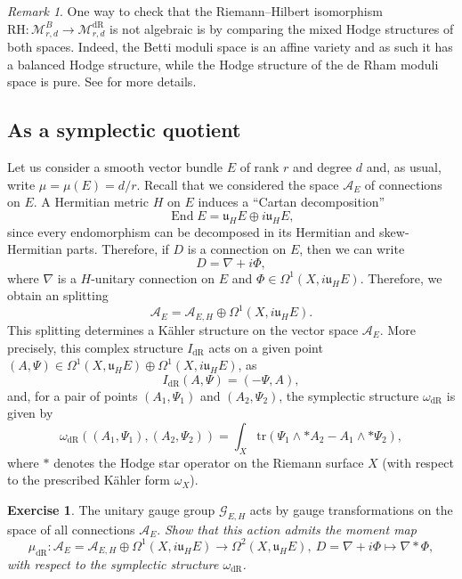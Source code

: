 \documentclass[12pt,a4paper]{amsbook}
\theoremstyle{remark} \newtheorem{rmk}[thm]{Remark}
\theoremstyle{definition} \newtheorem{defn}[thm]{Definition}
\theoremstyle{definition} \newtheorem{ex}[thm]{Example}
\theoremstyle{definition} \newtheorem{ej}{Exercise}
\newcommand{\cA}{\mathcal A}
\newcommand{\cG}{\mathcal G}
\newcommand{\fu}{\mathfrak u}
\newcommand{\dR}{\mathrm{dR}}
\DeclareMathOperator{\End}{End}
\begin{document}
\begin{rmk}
One way to check that the Riemann--Hilbert isomorphism $\mathrm{RH}: \mathcal{M}^B_{r,d} \rightarrow \mathcal{M}^{\dR}_{r,d}$ is not algebraic is by comparing the mixed Hodge structures of both spaces. Indeed, the Betti moduli space is an affine variety and as such it has a balanced Hodge structure, while the Hodge structure of the de Rham moduli space is pure. See \cite{HauselMSNAHT} for more details.
\end{rmk}

\subsection*{As a symplectic quotient}
Let us consider a smooth vector bundle $E$ of rank $r$ and degree $d$ and, as usual, write $\mu=\mu(E)=d/r$. Recall that we considered the space $\cA_E$ of connections on $E$. A Hermitian metric $H$ on $E$ induces a ``Cartan decomposition''
\begin{equation*}
\End E = \mathfrak{u}_H E \oplus i \mathfrak{u}_H E,
\end{equation*}
since every endomorphism can be decomposed in its Hermitian and skew-Hermitian parts. Therefore, if $D$ is a connection on $E$, then we can write
\begin{equation*}
D= \nabla + i\Phi,
\end{equation*}
where $\nabla$ is a  $H$-unitary connection on $E$ and $\Phi \in \Omega^{1}(X,i \mathfrak{u}_H E)$. Therefore, we obtain an splitting
\begin{equation*}
\cA_E = \cA_{E,H} \oplus \Omega^1(X,i \fu_H E).
\end{equation*}
This splitting determines a Kähler structure on the vector space $\cA_E$. More precisely, this complex structure $I_{\dR}$ acts on a given point $(A,\Psi) \in \Omega^1(X,\fu_H E) \oplus \Omega^1(X,i \fu_H E)$, as
\begin{equation*}
I_{\dR}(A,\Psi) = (-\Psi, A),
\end{equation*}
and, for a pair of points $(A_1,\Psi_1)$ and $(A_2,\Psi_2)$, the symplectic structure $\omega_{\dR}$ is given by
\begin{equation*}
\omega_{\dR}((A_1,\Psi_1),(A_2,\Psi_2)) = \int_X \mathrm{tr} (\Psi_1 \wedge * A_2 - A_1 \wedge * \Psi_2),
\end{equation*}
where $*$ denotes the Hodge star operator on the Riemann surface $X$ (with respect to the prescribed Kähler form $\omega_X$).

\begin{ej}
The unitary gauge group $\cG_{E,H}$ acts by gauge transformations on the space of all connections $\cA_E$.
\textit{Show that this action admits the moment map}
\begin{equation*}
\mu_{\dR}: \cA_E = \cA_{E,H} \oplus \Omega^1(X,i \fu_H E) \longrightarrow \Omega^2(X,\fu_H E), \ D=\nabla + i\Phi \mapsto \nabla * \Phi,
\end{equation*}
\textit{with respect to the symplectic structure $\omega_{\dR}$.}
\end{ej}
\end{document}
